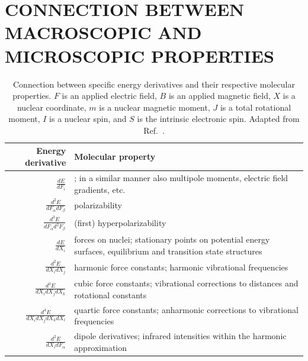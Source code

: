\documentclass[%
class = book,%
crop = false,%
float = true,%
multi = true,%
preview = false,%
]{standalone}
\newcommand{\caps}[1]{\uppercase{#1}}
\begin{document}
\section[\texorpdfstring{\caps{Macroscopic and Microscopic Response Connections}}{Macroscopic and Microscopic Response Connections}]{\texorpdfstring{\caps{Connection Between Macroscopic and Microscopic Properties}}{Connection Between Macroscopic and Microscopic Properties}}
\label{sec:connection-between-macroscopic-and-microscopic}

\begin{table}
  \centering
  \caption[Connection between energy derivatives and molecular properties]{Connection between specific energy derivatives and their respective molecular properties. \(F\) is an applied electric field, \(B\) is an applied magnetic field, \(X\) is a nuclear coordinate, \(m\) is a nuclear magnetic moment, \(J\) is a total rotational moment, \(I\) is a nuclear spin, and \(S\) is the intrinsic electronic spin. Adapted from Ref.~\parencite{gauss2000}.\label{tab:gauss}}
  \begin{singlespace}
    \begin{tabulary}{0.85\textwidth}{rL}
      \toprule
      \textbf{Energy derivative} & \textbf{Molecular property} \\
      \midrule
      \(\frac{dE}{dF_{i}}\)                          & \href{https://chemistry.stackexchange.com/q/31075/194}{\color{black}{dipole moment}}; in a similar manner also multipole moments, electric field gradients, etc. \\
      \(\frac{d^{2}E}{dF_{\alpha}dF_{\beta}}\)       & polarizability \\
      \(\frac{d^{3}E}{dF_{\alpha}d^{2}F_{\beta}}\)   & (first) hyperpolarizability \\
      \(\frac{dE}{dX_{i}}\)                          & forces on nuclei; stationary points on potential energy surfaces, equilibrium and transition state structures \\
      \(\frac{d^{2}E}{dX_{i}dX_{j}}\)                & harmonic force constants; harmonic vibrational frequencies \\
      \(\frac{d^{3}E}{dX_{i}dX_{j}dX_{k}}\)          & cubic force constants; vibrational corrections to distances and rotational constants \\
      \(\frac{d^{4}E}{dX_{i}dX_{j}dX_{k}dX_{l}}\)    & quartic force constants; anharmonic corrections to vibrational frequencies \\
      \(\frac{d^{2}E}{dX_{i}dF_{\alpha}}\)           & dipole derivatives; infrared intensities within the harmonic approximation \\

\end{tabulary}
\end{singlespace}
\end{table}
\end{document}
